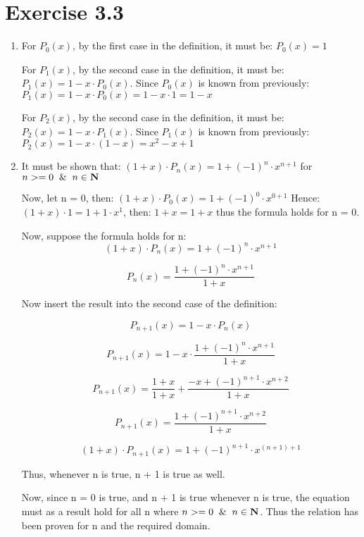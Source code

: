 \section{Exercise 3.3}
\renewcommand{\labelenumi}{\alph{enumi})}
\begin{enumerate}
\item
For $P_{0}(x)$, by the first case in the definition, it must be: $P_{0}(x) = 1$

For $P_{1}(x)$, by the second case in the definition, it must be: $P_{1}(x) = 1 - x \cdot P_{0}(x)$. Since $P_{0}(x)$ is known from previously: $P_{1}(x) = 1 - x \cdot P_{0}(x) = 1 - x \cdot 1 = 1 - x$

For $P_{2}(x)$, by the second case in the definition, it must be: $P_{2}(x) = 1 - x \cdot P_{1}(x)$. Since $P_{1}(x)$ is known from previously: $P_{2}(x) = 1 - x \cdot (1 - x) = x^{2} - x + 1$

\item
It must be shown that: $(1+x) \cdot P_{n}(x) = 1 + (-1)^{n} \cdot x^{n+1}$ for $n >= 0 \And n \in \mathbf{N}$

Now, let n = 0, then: $(1+x) \cdot P_{0}(x) = 1 + (-1)^{0} \cdot x^{0+1}$ Hence: $(1+x) \cdot 1 = 1 + 1 \cdot x^{1}$, then: $1+x = 1 + x$ thus the formula holds for n = 0.

Now, suppose the formula holds for n:
\begin{equation}
    (1+x) \cdot P_{n}(x) = 1 + (-1)^{n} \cdot x^{n+1}
\end{equation}

\begin{equation}
    P_{n}(x) = \frac{1 + (-1)^{n} \cdot x^{n+1}}{1+x}
\end{equation}

Now insert the result into the second case of the definition:

\begin{equation}
    P_{n+1}(x) = 1 - x \cdot P_{n}(x)
\end{equation}

\begin{equation}
    P_{n+1}(x) = 1 - x \cdot \frac{1 + (-1)^{n} \cdot x^{n+1}}{1+x}
\end{equation}

\begin{equation}
    P_{n+1}(x) = \frac{1 + x}{1 + x} + \frac{-x + (-1)^{n+1} \cdot x^{n+2}}{1+x}
\end{equation}

\begin{equation}
    P_{n+1}(x) = \frac{1 + (-1)^{n+1} \cdot x^{n+2}}{1+x}
\end{equation}

\begin{equation}
    (1+x) \cdot P_{n+1}(x) = 1 + (-1)^{n+1} \cdot x^{(n+1)+1}
\end{equation}

Thus, whenever n is true, n + 1 is true as well.

Now, since n = 0 is true, and n + 1 is true whenever n is true, the equation must as a result hold for all n where $n >= 0 \And n \in \mathbf{N}$. Thus the relation has been proven for n and the required domain.

\end{enumerate}